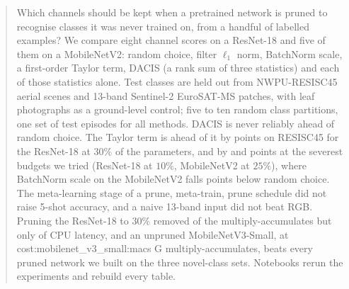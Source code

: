 \begin{abstract}
Which channels should be kept when a pretrained network is pruned to recognise classes it was never trained on, from a handful of labelled examples? We compare eight channel scores on a ResNet-18 and five of them on a MobileNetV2: random choice, filter $\ell_1$ norm, BatchNorm scale, a first-order Taylor term, DACIS (a rank sum of three statistics) and each of those statistics alone. Test classes are held out from NWPU-RESISC45 aerial scenes and 13-band Sentinel-2 EuroSAT-MS patches, with leaf photographs as a ground-level control; five to ten random class partitions, one set of test episodes for all methods. DACIS is never reliably ahead of random choice. The Taylor term is ahead of it by  points on RESISC45 for the ResNet-18 at $30\%$ of the parameters, and by  and  points at the severest budgets we tried (ResNet-18 at $10\%$, MobileNetV2 at $25\%$), where BatchNorm scale on the MobileNetV2 falls  points below random choice. The meta-learning stage of a prune, meta-train, prune schedule did not raise 5-shot accuracy, and a naive 13-band input did not beat RGB. Pruning the ResNet-18 to $30\%$ removed  of the multiply-accumulates but only  of CPU latency, and an unpruned MobileNetV3-Small, at \num{cost:mobilenet_v3_small:macs} G multiply-accumulates, beats every pruned network we built on the three novel-class sets. Notebooks rerun the experiments and rebuild every table.
\end{abstract}

